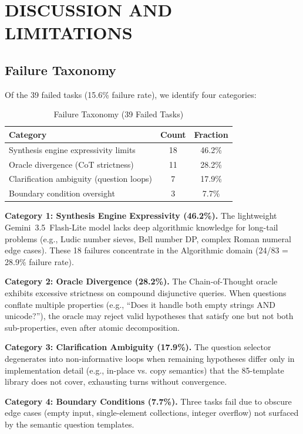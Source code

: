 \documentclass[10pt,conference]{IEEEtran}
\begin{document}
\section{DISCUSSION AND LIMITATIONS}\label{sec:discussion}

\subsection{Failure Taxonomy}
Of the 39 failed tasks (15.6\% failure rate), we identify four categories:

\begin{table}[htbp]
\centering
\caption{Failure Taxonomy (39 Failed Tasks)}
\label{tab:failure}
\footnotesize
\begin{tabular}{lcc}
\toprule
\textbf{Category} & \textbf{Count} & \textbf{Fraction} \\
\midrule
Synthesis engine expressivity limits & 18 & 46.2\% \\
Oracle divergence (CoT strictness) & 11 & 28.2\% \\
Clarification ambiguity (question loops) & 7 & 17.9\% \\
Boundary condition oversight & 3 & 7.7\% \\
\bottomrule
\end{tabular}
\end{table}

\textbf{Category 1: Synthesis Engine Expressivity (46.2\%).} The lightweight Gemini~3.5~Flash-Lite model lacks deep algorithmic knowledge for long-tail problems (e.g., Ludic number sieves, Bell number DP, complex Roman numeral edge cases). These 18 failures concentrate in the Algorithmic domain (24/83 = 28.9\% failure rate).

\textbf{Category 2: Oracle Divergence (28.2\%).} The Chain-of-Thought oracle exhibits excessive strictness on compound disjunctive queries. When questions conflate multiple properties (e.g., ``Does it handle both empty strings AND unicode?''), the oracle may reject valid hypotheses that satisfy one but not both sub-properties, even after atomic decomposition.

\textbf{Category 3: Clarification Ambiguity (17.9\%).} The question selector degenerates into non-informative loops when remaining hypotheses differ only in implementation detail (e.g., in-place vs. copy semantics) that the 85-template library does not cover, exhausting turns without convergence.

\textbf{Category 4: Boundary Conditions (7.7\%).} Three tasks fail due to obscure edge cases (empty input, single-element collections, integer overflow) not surfaced by the semantic question templates.
\end{document}

